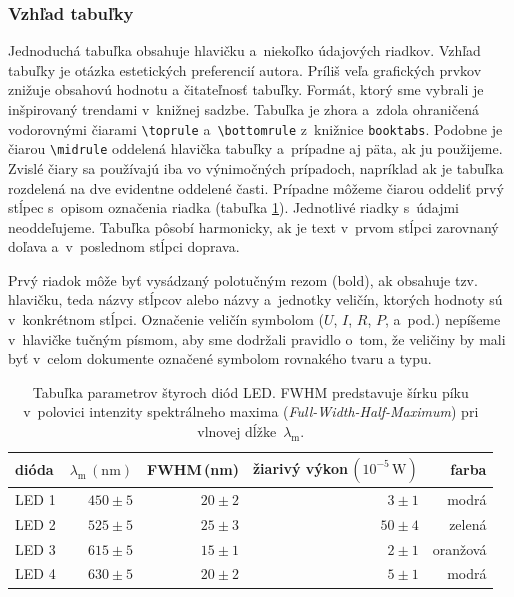 \subsubsection{Vzhľad tabuľky}
Jednoduchá tabuľka obsahuje hlavičku a~niekoľko
údajových riadkov.
Vzhľad tabuľky je otázka estetických preferencií autora.
Príliš veľa grafických prvkov znižuje obsahovú hodnotu a čitateľnosť tabuľky.
Formát, ktorý sme vybrali je inšpirovaný trendami
v~knižnej sadzbe.
Tabuľka je zhora a~zdola ohraničená vodorovnými čiarami 
\verb|\toprule| a~\verb|\bottomrule| z~knižnice \verb|booktabs|. 
Podobne je čiarou \verb|\midrule| oddelená hlavička tabuľky
a~prípadne aj päta, ak ju použijeme.
Zvislé čiary sa používajú iba vo výnimočných prípadoch, 
napríklad ak je tabuľka rozdelená na
dve evidentne oddelené časti.
Prípadne môžeme čiarou oddeliť prvý stĺpec s~opisom označenia riadka (tabuľka \ref{tab:LED}).
Jednotlivé riadky s~údajmi neoddeľujeme.
Tabuľka pôsobí harmonicky,
ak je text v~prvom stĺpci zarovnaný doľava
a~v~poslednom stĺpci doprava.

Prvý riadok môže byť vysádzaný polotučným 
rezom (bold),
ak obsahuje tzv. hlavičku, teda názvy stĺpcov alebo názvy
a~jednotky veličín, ktorých hodnoty sú v~konkrétnom stĺpci. 
Označenie veličín symbolom ($U$, $I$, $R$, $P$, a~pod.)
nepíšeme v~hlavičke tučným písmom,
aby sme dodržali pravidlo o~tom,
že veličiny by mali byť v~celom dokumente označené symbolom 
rovnakého tvaru a typu.

\begin{table}[h!]
  \caption{Tabuľka parametrov štyroch diód LED.
  FWHM predstavuje šírku píku v~polovici intenzity
  spektrálneho maxima (\foreignlanguage{english}{\emph{Full-Width-Half-Maximum}}) pri vlnovej dĺžke~$\lambda_\mathrm m$.}
  \label{tab:LED}
  \centering
  \begin{tabular}{@{}l|rrrr@{}}
    \toprule
    dióda & $\lambda_\mathrm m\,(\mathrm{nm})$ & FWHM\,(nm) & žiarivý výkon\,$(10^{-5}\,\mathrm W)$ & farba \\
    \midrule
    LED 1 & $450 \pm 5$ & $20\pm2$ & $3\pm1$ & modrá\\
    LED 2 & $525 \pm 5$ & $25\pm3$ & $50\pm4$ & zelená\\
    LED 3 & $615 \pm 5$ & $15\pm1$ & $2\pm1$ & oranžová\\
    LED 4 & $630 \pm 5$ & $20\pm2$ & $5\pm1$ & modrá\\
    \bottomrule
  \end{tabular}
\end{table}

